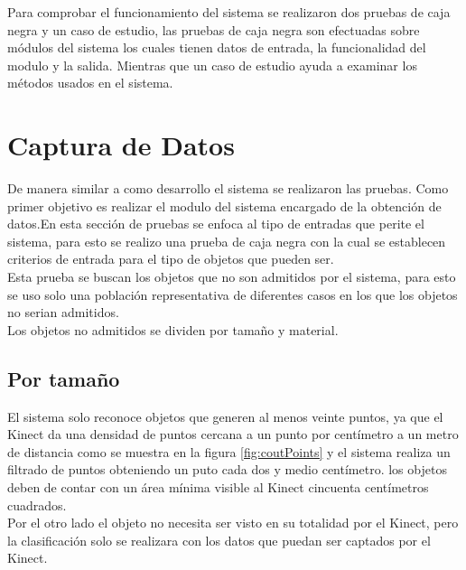 




Para comprobar el funcionamiento del sistema se realizaron dos pruebas de caja negra y un caso de estudio, las pruebas de caja negra son efectuadas sobre módulos del sistema los cuales tienen datos de entrada, la funcionalidad del modulo y la salida. Mientras que un caso de estudio ayuda a examinar los métodos usados en el sistema.

\section{Captura de Datos}

	De manera similar a como desarrollo el sistema se realizaron las pruebas. Como primer objetivo es realizar el modulo del sistema encargado de la obtención de datos.En esta sección de pruebas se enfoca al tipo de entradas que perite el sistema, para esto se realizo una prueba de caja negra con la cual se establecen criterios de entrada para el tipo de objetos que pueden ser.\\
	
	Esta prueba se buscan los objetos que no son admitidos por el sistema, para esto se uso solo una población representativa de diferentes casos en los que los objetos no serian admitidos.\\
	
	Los objetos no admitidos se dividen por tamaño y material.\\
	
	 \subsection{Por tamaño}
	
	 El sistema solo reconoce objetos que generen al menos veinte puntos, ya que el Kinect da una densidad de puntos cercana a un punto por centímetro a un metro de distancia como se muestra en la figura \ref{fig:coutPoints} y el sistema realiza un filtrado de puntos obteniendo un puto cada dos y medio centímetro. los objetos deben de contar con un área mínima visible al Kinect cincuenta centímetros cuadrados.\\
	 
	 Por el otro lado el objeto no necesita ser visto en su totalidad por el Kinect, pero la clasificación solo se realizara con los datos que puedan ser captados por el Kinect.\\
	 
